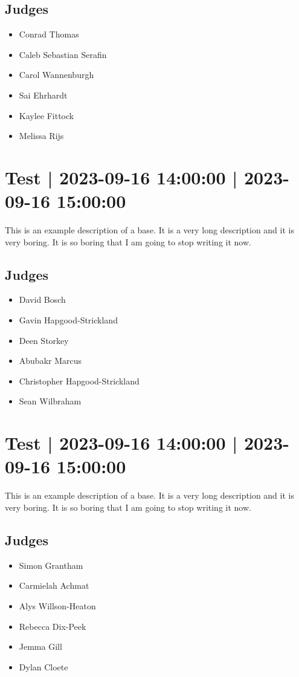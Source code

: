 \documentclass[10pt]{article}
\begin{document}
	\subsection*{Judges}
	\begin{itemize}

			\item Conrad Thomas
			\item Caleb Sebastian Serafin
			\item Carol Wannenburgh
			\item Sai Ehrhardt
			\item Kaylee Fittock
			\item Melissa Rijs
		\end{itemize}

			\setcounter{section}{5}
	\section{Test | 2023-09-16 14:00:00 | 2023-09-16 15:00:00}
	This is an example description of a base. It is a very long description and it is very boring. It is so boring that I am going to stop writing it now.

	\subsection*{Judges}
	\begin{itemize}

			\item David Bosch
			\item Gavin Hapgood-Strickland
			\item Deen Storkey
			\item Abubakr Marcus
			\item Christopher Hapgood-Strickland
			\item Sean Wilbraham
		\end{itemize}

			\setcounter{section}{6}
	\section{Test | 2023-09-16 14:00:00 | 2023-09-16 15:00:00}
	This is an example description of a base. It is a very long description and it is very boring. It is so boring that I am going to stop writing it now.

	\subsection*{Judges}
	\begin{itemize}

			\item Simon Grantham
			\item Carmielah Achmat
			\item Alys Willson-Heaton
			\item Rebecca Dix-Peek
			\item Jemma Gill
			\item Dylan Cloete
		\end{itemize}
\end{document}
